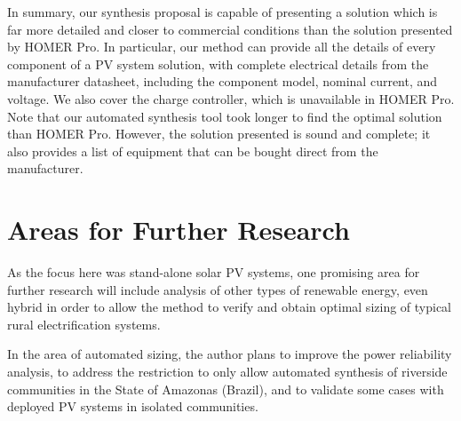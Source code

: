 In summary, our synthesis proposal is capable of presenting a solution which is far more detailed and closer to commercial conditions than the solution presented by HOMER Pro. In particular, our method can provide all the details of every component of a PV system solution, with complete electrical details from the manufacturer datasheet, including the component model, nominal current, and voltage. We also cover the charge controller, which is unavailable in HOMER Pro. Note that our automated synthesis tool took longer to find the optimal solution than HOMER Pro. However, the solution presented is sound and complete; it also provides a list of equipment that can be bought direct from the manufacturer.


\section{Areas for Further Research}

As the focus here was stand-alone solar PV systems, one promising area for further research will include analysis of other types of renewable energy, even hybrid  in order to allow the method to verify and obtain optimal sizing of typical rural electrification systems.

In the area of automated sizing, the author plans to improve the power reliability analysis, to address the restriction to only allow automated synthesis of riverside communities in the State of Amazonas (Brazil), and to validate some cases with deployed PV systems in isolated communities.

